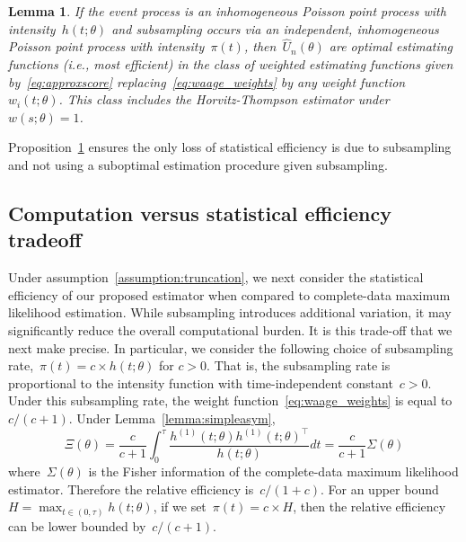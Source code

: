 \documentclass[12pt]{amsart}
\newtheorem{lemma}[thm]{Lemma}
\begin{document}
\begin{lemma} \normalfont
\label{prop:optimal}
If the event process is an inhomogeneous Poisson point process with intensity~$h(t; \theta)$ and subsampling occurs via an independent, inhomogeneous Poisson point process with intensity~$\pi (t)$, then~$\hat U_n (\theta)$ are optimal estimating functions (i.e., most efficient) in the class of weighted estimating functions given by~\eqref{eq:approxscore} replacing~\eqref{eq:waage_weights} by any weight function~$w_i (t; \theta)$. This class includes the Horvitz-Thompson estimator under~$w(s; \theta) = 1$.
\end{lemma}

\noindent Proposition~\ref{prop:optimal} ensures the only loss of statistical efficiency is due to subsampling and not using a suboptimal estimation procedure given subsampling.

\subsection{Computation versus statistical efficiency tradeoff}

Under assumption~\ref{assumption:truncation}, we next consider the statistical efficiency of our proposed estimator when compared to complete-data maximum likelihood estimation. While subsampling introduces additional variation, it may significantly reduce the overall computational burden. It is this trade-off that we next make precise. In particular, we consider the following choice of subsampling rate,~$\pi(t) = c \times h(t; \theta)$ for $c>0$. That is, the subsampling rate is proportional to the intensity function with time-independent constant~$c > 0$. Under this subsampling rate, the weight function~\eqref{eq:waage_weights} is equal to $c/ (c+1)$. Under Lemma~\ref{lemma:simpleasym},
\[
\Xi (\theta) = \frac{c}{c+1} \int_0^\tau \frac{ h^{(1)} (t; \theta)
  h^{(1)} (t; \theta)^\top}{h (t; \theta)} dt = \frac{c}{c+1} \Sigma (\theta)
\]
where~$\Sigma(\theta)$ is the Fisher information of the complete-data maximum likelihood estimator.
Therefore the relative efficiency is~$c/(1+c)$. For an upper bound~$H = \max_{t \in (0,\tau)} h(t;\theta)$, if we set~$\pi (t) = c \times H$, then the relative efficiency can be lower bounded by~$c / (c+1)$.
\end{document}
